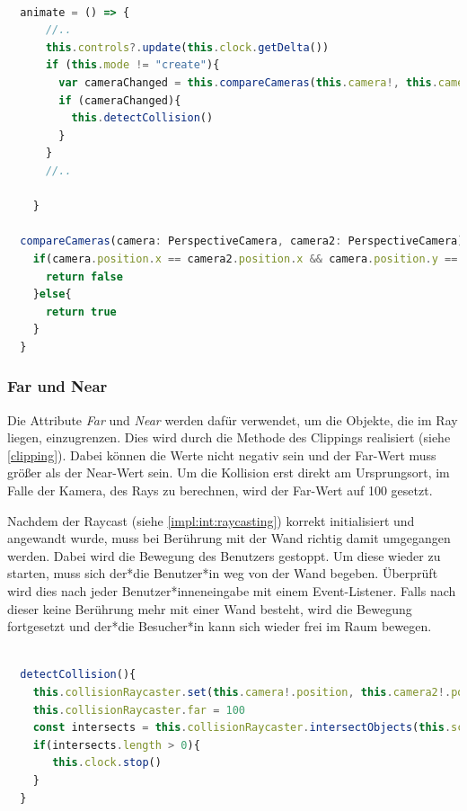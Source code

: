 \begin{lstlisting}[caption={Methode zum vergleichen der Position der Kameras},language=TypeScript,label=lst:impl:compareCameras]
    
  animate = () => {
      //..
      this.controls?.update(this.clock.getDelta())
      if (this.mode != "create"){
        var cameraChanged = this.compareCameras(this.camera!, this.camera2!)
        if (cameraChanged){
          this.detectCollision()
        }
      }
      //..
    
    }

  compareCameras(camera: PerspectiveCamera, camera2: PerspectiveCamera): boolean{
    if(camera.position.x == camera2.position.x && camera.position.y == camera2.position.y){
      return false
    }else{
      return true
    }
  }
\end{lstlisting}

\subsubsection{Far und Near}
Die Attribute \emph{Far} und \emph{Near} werden dafür verwendet, um die Objekte, die im Ray liegen, einzugrenzen. Dies wird durch die Methode des Clippings realisiert (siehe \ref{clipping}). Dabei können die Werte nicht negativ sein und der Far-Wert muss größer als der Near-Wert sein. Um die Kollision erst direkt am Ursprungsort, im Falle der Kamera, des Rays zu berechnen, wird der Far-Wert auf 100 gesetzt.
   	
Nachdem der Raycast (siehe \ref{impl:int:raycasting}) korrekt initialisiert und angewandt wurde, muss bei Berührung mit der Wand richtig damit umgegangen werden. Dabei wird die Bewegung des Benutzers gestoppt. Um diese wieder zu starten, muss sich der*die Benutzer*in weg von der Wand begeben. Überprüft wird dies nach jeder Benutzer*inneneingabe mit einem Event-Listener. Falls nach dieser keine Berührung mehr mit einer Wand besteht, wird die Bewegung fortgesetzt und der*die Besucher*in kann sich wieder frei im Raum bewegen.

\begin{lstlisting}[caption={Methode zum ermitteln einer Kollision mit der Wand},language=TypeScript,label=lst:impl:detectCollision]
    
  detectCollision(){
    this.collisionRaycaster.set(this.camera!.position, this.camera2!.position.normalize())
    this.collisionRaycaster.far = 100
    const intersects = this.collisionRaycaster.intersectObjects(this.scene.children)
    if(intersects.length > 0){
       this.clock.stop()
    }
  }

\end{lstlisting}

